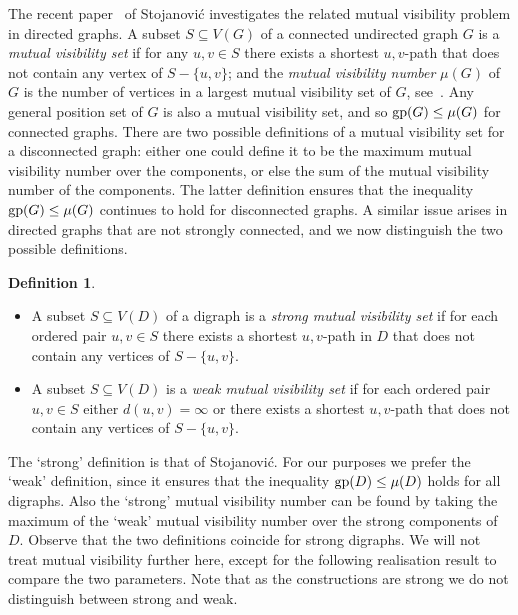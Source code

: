 \documentclass[a4paper,12pt]{article}
\theoremstyle{definition}
\newtheorem{definition}[theorem]{Definition}
\newcommand{\gp}{{\rm gp}}
\begin{document}
	The recent paper~\cite{digraphs} of Stojanovi\'{c} investigates the related mutual visibility problem in directed graphs. A subset $S \subseteq V(G)$ of a connected undirected graph $G$ is a \emph{mutual visibility set} if for any $u,v \in S$ there exists a shortest $u,v$-path that does not contain any vertex of $S-\{ u,v\} $; and the \emph{mutual visibility number} $\mu (G)$ of $G$ is the number of vertices in a largest mutual visibility set of $G$, see~\cite{DiStefano}. Any general position set of $G$ is also a mutual visibility set, and so $\gp (G) \leq \mu (G)$ for connected graphs. There are two possible definitions of a mutual visibility set for a disconnected graph: either one could define it to be the maximum mutual visibility number over the components, or else the sum of the mutual visibility number of the components. The latter definition ensures that the inequality $\gp (G) \leq \mu (G)$ continues to hold for disconnected graphs. A similar issue arises in directed graphs that are not strongly connected, and we now distinguish the two possible definitions.
	
	\begin{definition}
		\text{ }
		\begin{itemize}
			\item A subset $S \subseteq V(D)$ of a digraph is a \emph{strong mutual visibility set} if for each ordered pair $u,v \in S$ there exists a shortest $u,v$-path in $D$ that does not contain any vertices of $S-\{ u,v\} $.
			\item A subset $S \subseteq V(D)$ is a \emph{weak mutual visibility set} if for each ordered pair $u,v \in S$ either $d(u,v) = \infty $ or there exists a shortest $u,v$-path that does not contain any vertices of $S- \{ u,v\} $.
		\end{itemize}
	\end{definition}
	The `strong' definition is that of Stojanovi\'{c}. For our purposes we prefer the `weak' definition, since it ensures that the inequality $\gp (D) \leq \mu (D)$ holds for all digraphs. Also the `strong' mutual visibility number can be found by taking the maximum of the `weak' mutual visibility number over the strong components of $D$. Observe that the two definitions coincide for strong digraphs. We will not treat mutual visibility further here, except for the following realisation result to compare the two parameters. Note that as the constructions are strong we do not distinguish between strong and weak.
	
\end{document}
